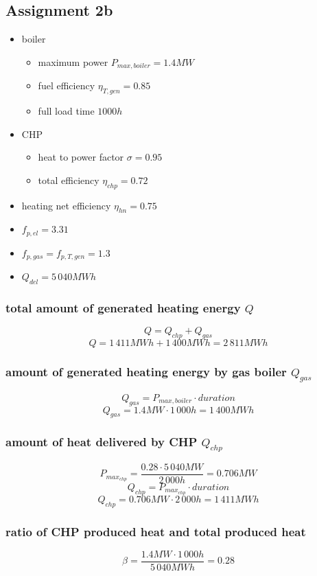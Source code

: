 \documentclass{article}
\begin{document}
	\newpage
	\subsection*{Assignment 2b}
		\begin{itemize}
			\item boiler
				\begin{itemize}
					\item maximum power $P_{max,boiler}=1.4MW$
					\item fuel efficiency $\eta_{T,gen}=0.85$
					\item full load time $1000h$
				\end{itemize}
			\item CHP
				\begin{itemize}
					\item heat to power factor $\sigma=0.95$
					\item total efficiency $\eta_{chp}=0.72$
				\end{itemize}
			\item heating net efficiency $\eta_{hn}=0.75$
			\item $f_{p,el}=3.31$
			\item $f_{p,gas}=f_{p,T,gen}=1.3$
			\item $Q_{del}=5\,040MWh$
		\end{itemize}

		\subsubsection*{total amount of generated heating energy $Q$}
			$$Q=Q_{chp}+Q_{gas}$$
			$$Q=1\,411MWh+1\,400MWh=2\,811MWh$$
		\subsubsection*{amount of generated heating energy by gas boiler $Q_{gas}$}
			$$Q_{gas}=P_{max,boiler}\cdot duration$$
			$$Q_{gas}=1.4MW\cdot 1\,000h=1\,400MWh$$
		\subsubsection*{amount of heat delivered by CHP $Q_{chp}$}
			$$P_{max_{chp}}=\frac{0.28\cdot 5\,040MW}{2\,000h}=0.706MW$$
			$$Q_{chp}=P_{max_{chp}}\cdot duration$$
			$$Q_{chp}=0.706MW\cdot 2\,000h = 1\,411MWh$$
		\subsubsection*{ratio of CHP produced heat and total produced heat}
			$$\beta=\frac{1.4MW\cdot 1\,000h}{5\,040MWh}=0.28$$
\end{document}
